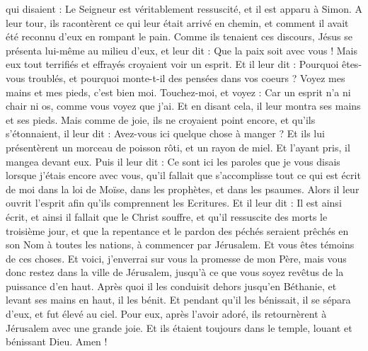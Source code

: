 \begin{multicols}{2}
qui disaient : Le Seigneur est véritablement ressuscité, et il est apparu à Simon.
A leur tour, ils racontèrent ce qui leur était arrivé en chemin, et comment il avait été reconnu d'eux en rompant le pain.
Comme ils tenaient ces discours, Jésus se présenta lui-même au milieu d'eux, et leur dit : Que la paix soit avec vous !
Mais eux tout terrifiés et effrayés croyaient voir un esprit.
Et il leur dit : Pourquoi êtes-vous troublés, et pourquoi monte-t-il des pensées dans vos coeurs ?
Voyez mes mains et mes pieds, c’est bien moi. Touchez-moi, et voyez : Car un esprit n'a ni chair ni os, comme vous voyez que j'ai.
Et en disant cela, il leur montra ses mains et ses pieds.
Mais comme de joie, ils ne croyaient point encore, et qu'ils s'étonnaient, il leur dit : Avez-vous ici quelque chose à manger ?
Et ils lui présentèrent un morceau de poisson rôti, et un rayon de miel.
Et l'ayant pris, il mangea devant eux.
Puis il leur dit : Ce sont ici les paroles que je vous disais lorsque j’étais encore avec vous, qu’il fallait que s’accomplisse tout ce qui est écrit de moi dans la loi de Moïse, dans les prophètes, et dans les psaumes.
Alors il leur ouvrit l'esprit afin qu’ils comprennent les Ecritures.
Et il leur dit : Il est ainsi écrit, et ainsi il fallait que le Christ souffre, et qu'il ressuscite des morts le troisième jour,
et que la repentance et le pardon des péchés seraient prêchés en son Nom à toutes les nations, à commencer par Jérusalem.
Et vous êtes témoins de ces choses. 
Et voici, j’enverrai sur vous la promesse de mon Père, mais vous donc restez dans la ville de Jérusalem, jusqu'à ce que vous soyez revêtus de la puissance d'en haut.
Après quoi il les conduisit dehors jusqu'en Béthanie, et levant ses mains en haut, il les bénit.
Et pendant qu'il les bénissait, il se sépara d'eux, et fut élevé au ciel.
Pour eux, après l’avoir adoré, ils retournèrent à Jérusalem avec une grande joie.
Et ils étaient toujours dans le temple, louant et bénissant Dieu. Amen !
\PPE{}
\end{multicols}
